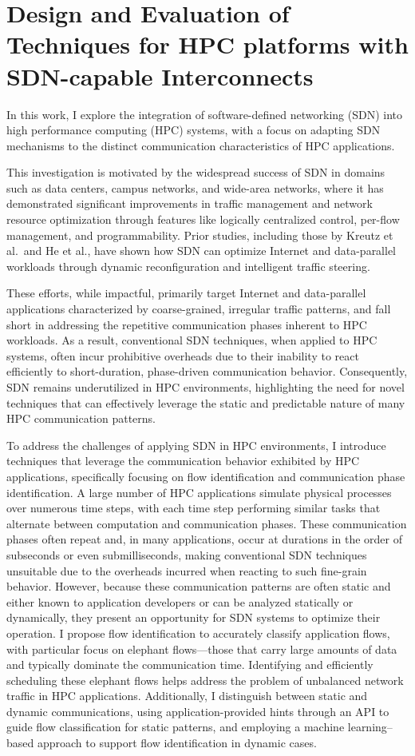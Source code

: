 \chapter{Design and Evaluation of Techniques for HPC platforms with SDN-capable Interconnects} 
In this work, I explore the integration of software-defined networking (SDN) into high performance computing (HPC) systems, with a focus on adapting SDN mechanisms to the distinct communication characteristics of HPC applications.

This investigation is motivated by the widespread success of SDN in domains such as data centers, campus networks, and wide-area networks, where it has demonstrated significant improvements in traffic management and network resource optimization through features like logically centralized control, per-flow management, and programmability. Prior studies, including those by Kreutz et al.\ and He et al., have shown how SDN can optimize Internet and data-parallel workloads through dynamic reconfiguration and intelligent traffic steering.

These efforts, while impactful, primarily target Internet and data-parallel applications characterized by coarse-grained, irregular traffic patterns, and fall short in addressing the repetitive communication phases inherent to HPC workloads. As a result, conventional SDN techniques, when applied to HPC systems, often incur prohibitive overheads due to their inability to react efficiently to short-duration, phase-driven communication behavior. Consequently, SDN remains underutilized in HPC environments, highlighting the need for novel techniques that can effectively leverage the static and predictable nature of many HPC communication patterns.

To address the challenges of applying SDN in HPC environments, I introduce techniques that leverage the communication behavior exhibited by HPC applications, specifically focusing on flow identification and communication phase identification. A large number of HPC applications simulate physical processes over numerous time steps, with each time step performing similar tasks that alternate between computation and communication phases. These communication phases often repeat and, in many applications, occur at durations in the order of subseconds or even submilliseconds, making conventional SDN techniques unsuitable due to the overheads incurred when reacting to such fine-grain behavior. However, because these communication patterns are often static and either known to application developers or can be analyzed statically or dynamically, they present an opportunity for SDN systems to optimize their operation. I propose flow identification to accurately classify application flows, with particular focus on elephant flows---those that carry large amounts of data and typically dominate the communication time. Identifying and efficiently scheduling these elephant flows helps address the problem of unbalanced network traffic in HPC applications. Additionally, I distinguish between static and dynamic communications, using application-provided hints through an API to guide flow classification for static patterns, and employing a machine learning--based approach to support flow identification in dynamic cases.

